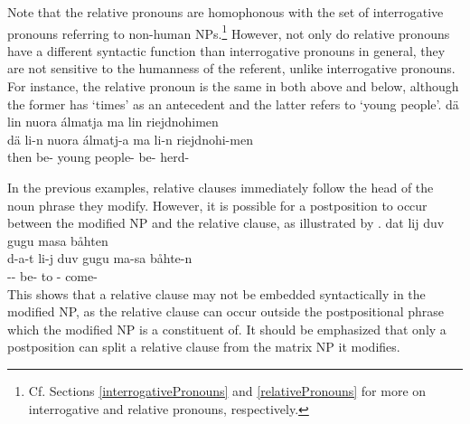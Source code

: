 Note that the relative pronouns are homophonous with the %
set of interrogative pronouns referring to non-human NPs.\footnote{Cf. Sections \ref{interrogativePronouns} and \ref{relativePronouns} for more on interrogative and relative pronouns, respectively.} 
However, not only do relative pronouns have a different syntactic function than interrogative pronouns in general, they are not sensitive to the humanness of the referent, unlike interrogative pronouns. For instance, the relative pronoun  is the same in both  above and  below, although the former has ‘times’ as an antecedent and the latter refers to ‘young people’.
\ea\label{relClause5}%
\glll	dä lin nuora álmatja ma lin riejdnohimen\\
	dä li-n nuora álmatj-a ma li-n riejdnohi-men\\
	then be- young\BS{} people- \BS{} be- herd-\\\nopagebreak
{} 
\z

In the previous examples, relative clauses immediately follow the head of the noun phrase they modify. However, it is possible for a postposition to occur between the modified NP and the relative clause, as illustrated by . 
\ea\label{relClause6}%
\glll	dat lij duv gugu masa båhten\\
	d-a-t li-j duv gugu ma-sa båhte-n\\
	-- be-  to - come-\\\nopagebreak
{} 
\z
This shows that a relative clause may not be embedded syntactically in the modified NP, as the relative clause can occur outside the postpositional phrase which the modified NP is a constituent of. It should be emphasized that only a postposition can split a relative clause from the matrix NP it modifies.

